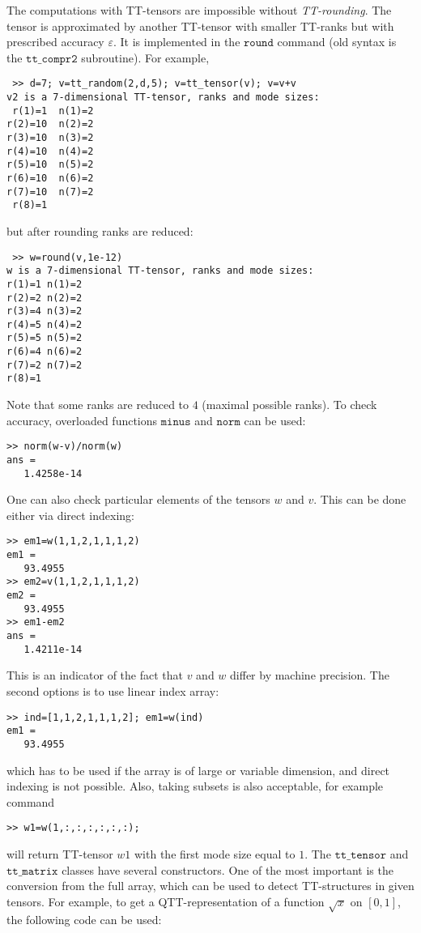 \documentclass[a4paper,12pt,twoside]{article}
\def\tt{\texttt{tt\_tensor}}
\def\ttm{\texttt{tt\_matrix}}
\begin{document}
The computations with TT-tensors are impossible without \emph{TT-rounding}. The tensor
is approximated by another TT-tensor with smaller TT-ranks but with prescribed accuracy $\varepsilon$.
It is implemented in the $\texttt{round}$ command (old syntax is the $\texttt{tt\_compr2}$ subroutine). 
For example, 
\begin{lstlisting}
 >> d=7; v=tt_random(2,d,5); v=tt_tensor(v); v=v+v
v2 is a 7-dimensional TT-tensor, ranks and mode sizes: 
 r(1)=1  n(1)=2
r(2)=10  n(2)=2
r(3)=10  n(3)=2
r(4)=10  n(4)=2
r(5)=10  n(5)=2
r(6)=10  n(6)=2
r(7)=10  n(7)=2
 r(8)=1        
\end{lstlisting}
but after rounding ranks are reduced:
\begin{lstlisting}
 >> w=round(v,1e-12)
w is a 7-dimensional TT-tensor, ranks and mode sizes: 
r(1)=1 n(1)=2
r(2)=2 n(2)=2
r(3)=4 n(3)=2
r(4)=5 n(4)=2
r(5)=5 n(5)=2
r(6)=4 n(6)=2
r(7)=2 n(7)=2
r(8)=1       
\end{lstlisting}
Note that some ranks are reduced to $4$ (maximal possible ranks).
To check accuracy, overloaded functions $\texttt{minus}$ and $\texttt{norm}$ can be used:
\begin{lstlisting}
>> norm(w-v)/norm(w)
ans =
   1.4258e-14
\end{lstlisting}
One can also check particular elements of the tensors $w$ and $v$. This can be done either via direct indexing:
\begin{lstlisting}
>> em1=w(1,1,2,1,1,1,2)
em1 =
   93.4955
>> em2=v(1,1,2,1,1,1,2)
em2 =
   93.4955
>> em1-em2
ans = 
   1.4211e-14
\end{lstlisting}
This is an indicator of the fact that $v$ and $w$ differ by machine precision. 
The second options is to use linear index array:
\begin{lstlisting}
>> ind=[1,1,2,1,1,1,2]; em1=w(ind)
em1 =
   93.4955
\end{lstlisting}
which has to be used if the array is of large or variable dimension, and direct indexing is not possible.
Also, taking subsets is also acceptable, for example command
\begin{lstlisting}
>> w1=w(1,:,:,:,:,:,:);
\end{lstlisting}
 will return TT-tensor $w1$ with the first mode size equal to $1$.
The $\tt$ and $\ttm$ classes have several constructors. One of the most important
is the conversion from the full array, which can be used to detect 
TT-structures in given tensors.
 For example, to get a QTT-representation of a function $\sqrt{x}$
on $[0,1]$, the following code can be used:
\end{document}
